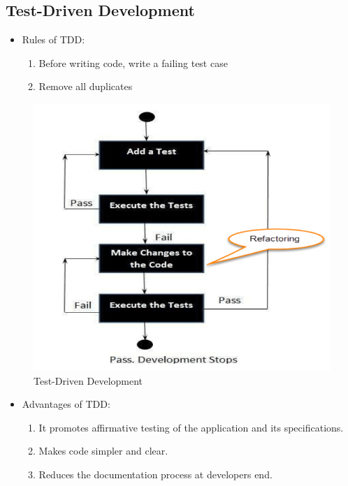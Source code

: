 \documentclass{article}
\begin{document}
\subsection{Test-Driven Development}
\begin{itemize}
    \item Rules of TDD:
    \begin{enumerate}
        \item Before writing code, write a failing test case
        
        \item Remove all duplicates
    \end{enumerate}
\end{itemize}
\begin{figure}[!ht]
    \centering
    \includegraphics[scale=0.5]{st1.png}
    \caption{Test-Driven Development}
    \label{fig:my_label}
\end{figure}

\begin{itemize}
    \item Advantages of TDD:
    \begin{enumerate}
        \item It promotes affirmative testing of the application and its specifications.
        
        \item Makes code simpler and clear.

        \item Reduces the documentation process at developers end.
    \end{enumerate}
\end{itemize}
\end{document}
